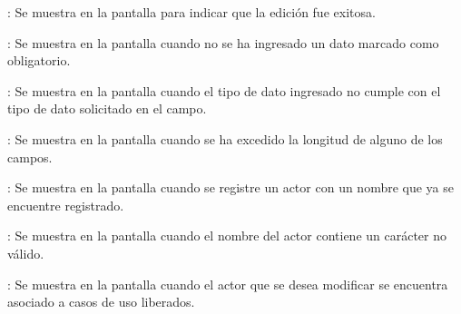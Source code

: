 \begin{Citemize}
	\item {}: Se muestra en la pantalla  para indicar que la edición fue exitosa.
	\item {}: Se muestra en la pantalla  cuando no se ha ingresado un dato marcado como obligatorio.
	\item {}: Se muestra en la pantalla  cuando el tipo de dato ingresado no cumple con el tipo de dato solicitado en el campo.
	\item {}: Se muestra en la pantalla  cuando se ha excedido la longitud de alguno de los campos.
	\item {}: Se muestra en la pantalla  cuando se registre un actor con un nombre que ya se encuentre registrado.
	\item {}: Se muestra en la pantalla  cuando el nombre del actor contiene un carácter no válido.
	\item {}: Se muestra en la pantalla  cuando el actor que se desea modificar se encuentra asociado a casos de uso liberados.
\end{Citemize}
